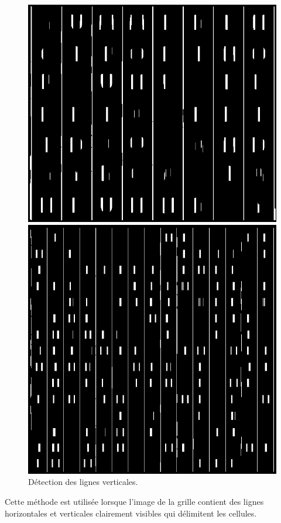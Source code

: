 \documentclass{article}
\begin{document}
\begin{figure}[H]
  \centering
      \includegraphics[width=\linewidth]{ressources/image_1_step_09_vertical_lines.png}
      \caption{}
    \endminipage\quad\quad\quad\quad
    \includegraphics[width=\linewidth]{ressources/image_2_step_09_vertical_lines.png}
    \caption{}
  \endminipage
  \caption{Détection des lignes verticales.}
\end{figure}
Cette méthode est utilisée lorsque l'image de la grille contient des lignes horizontales et verticales clairement visibles qui délimitent les cellules.
\end{document}
